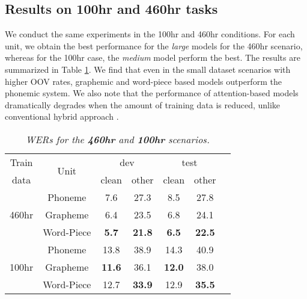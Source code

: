 \documentclass[a4paper]{article}
\begin{document}
\subsection{Results on 100hr and 460hr tasks}
\vspace{-2mm}
We conduct the same experiments in the 100hr and 460hr conditions.
For each unit, we obtain the best performance for the \textit{large} models
for the 460hr scenario, whereas for the 100hr case, the \textit{medium} model perform
the best. The results are summarized in Table \ref{460100overview}. We find that even
in the small dataset scenarios with higher OOV rates, graphemic and word-piece based
models outperform the phonemic system. We also note that the performance of attention-based
models dramatically degrades when the amount of training data is reduced, unlike conventional
hybrid approach \cite{panayotov2015librispeech}.
\begin{table}[h]
	\centering
\vspace{-3mm}
	\caption{\it WERs for the \textbf{460hr} and \textbf{100hr} scenarios.}
		\vspace{-1mm}
\vspace{-2mm}
	\label{460100overview}
	\begin{tabular}{ |c|c|c|c|c|c|c|} \hline
		Train   & \multirow{2}{*}{Unit} & \multicolumn{2}{|c|}{dev} & \multicolumn{2}{|c|}{test}    \\ \cline{3-6}
		data   &  & clean & other & clean & other    \\ \hline
		\multirow{3}{*}{460hr} & Phoneme&   7.6 &  27.3 & 8.5 & 27.8 \\
		& Grapheme&  6.4 & 23.5 & 6.8 &  24.1 \\ 
		& Word-Piece  & \textbf{5.7} & \textbf{21.8} & \textbf{6.5} & \textbf{22.5}  \\ \hline
		\multirow{3}{*}{100hr} &  Phoneme &  13.8 & 38.9 & 14.3 & 40.9 \\
		& Grapheme  &  \textbf{11.6} & 36.1 &  \textbf{12.0} &  38.0 \\ 
		& Word-Piece& 12.7 & \textbf{33.9} &  12.9 &  \textbf{35.5}  \\ \hline
		
	\end{tabular}
\vspace{-5mm}
\end{table}
\vspace{-3mm}
\end{document}
